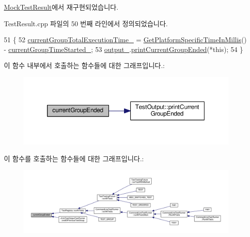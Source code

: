\hyperlink{class_mock_test_result_a4876529940f7a22328b8ee135ec75c6b}{Mock\+Test\+Result}에서 재구현되었습니다.



Test\+Result.\+cpp 파일의 50 번째 라인에서 정의되었습니다.


\begin{DoxyCode}
51 \{
52     \hyperlink{class_test_result_affeb08a81fa11df1befb80894f2609ed}{currentGroupTotalExecutionTime\_} = 
      \hyperlink{_platform_specific_functions__c_8h_a33cb0a70a9113e80f5334a906151d4dc}{GetPlatformSpecificTimeInMillis}() - 
      \hyperlink{class_test_result_aa9b1fed3dedb9610f6703333d8e62ec9}{currentGroupTimeStarted\_};
53     \hyperlink{class_test_result_ac3a8d866a9a5666377f4b37771255ff1}{output\_}.\hyperlink{class_test_output_a037b2a87826c7f59e7353cb137deacae}{printCurrentGroupEnded}(*\textcolor{keyword}{this});
54 \}
\end{DoxyCode}


이 함수 내부에서 호출하는 함수들에 대한 그래프입니다.\+:
\nopagebreak
\begin{figure}[H]
\begin{center}
\leavevmode
\includegraphics[width=339pt]{class_test_result_a9373b80002f576f0328c80f3c7571c8a_cgraph}
\end{center}
\end{figure}




이 함수를 호출하는 함수들에 대한 그래프입니다.\+:
\nopagebreak
\begin{figure}[H]
\begin{center}
\leavevmode
\includegraphics[width=350pt]{class_test_result_a9373b80002f576f0328c80f3c7571c8a_icgraph}
\end{center}
\end{figure}


